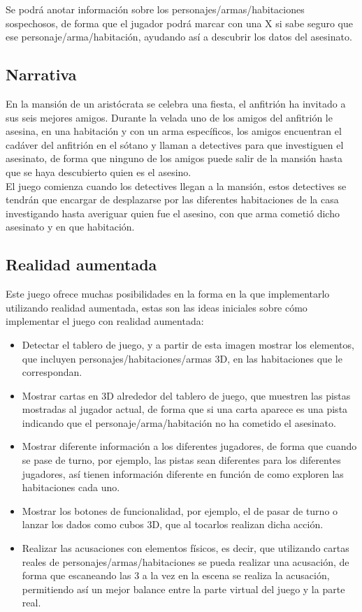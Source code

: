 Se podrá anotar información sobre los personajes/armas/habitaciones sospechosos, de forma que el jugador podrá marcar con una X si sabe seguro que ese personaje/arma/habitación, ayudando así a descubrir los datos del asesinato.

\subsection{Narrativa}
En la mansión de un aristócrata se celebra una fiesta, el anfitrión ha invitado a sus seis mejores amigos. Durante la velada uno de los amigos del anfitrión le asesina, en una habitación y con un arma específicos, los amigos encuentran el cadáver del anfitrión en el sótano y llaman a detectives para que investiguen el asesinato, de forma que ninguno de los amigos puede salir de la mansión hasta que se haya descubierto quien es el asesino.\\

El juego comienza cuando los detectives llegan a la mansión, estos detectives se tendrán que encargar de desplazarse por las diferentes habitaciones de la casa investigando hasta averiguar quien fue el asesino, con que arma cometió dicho asesinato y en que habitación.

\subsection{Realidad aumentada}
Este juego ofrece muchas posibilidades en la forma en la que implementarlo utilizando realidad aumentada, estas son las ideas iniciales sobre cómo implementar el juego con realidad aumentada:

\begin{itemize}
  \item Detectar el tablero de juego, y a partir de esta imagen mostrar los elementos, que incluyen personajes/habitaciones/armas 3D, en las habitaciones que le correspondan.
  \item Mostrar cartas en 3D alrededor del tablero de juego, que muestren las pistas mostradas al jugador actual, de forma que si una carta aparece es una pista indicando que el personaje/arma/habitación no ha cometido el asesinato.
  \item Mostrar diferente información a los diferentes jugadores, de forma que cuando se pase de turno, por ejemplo, las pistas sean diferentes para los diferentes jugadores, así tienen información diferente en función de como exploren las habitaciones cada uno.
  \item Mostrar los botones de funcionalidad, por ejemplo, el de pasar de turno o lanzar los dados como cubos 3D, que al tocarlos realizan dicha acción.
  \item Realizar las acusaciones con elementos físicos, es decir, que utilizando cartas reales de personajes/armas/habitaciones se pueda realizar una acusación, de forma que escaneando las 3 a la vez en la escena se realiza la acusación, permitiendo así un mejor balance entre la parte virtual del juego y la parte real.
\end{itemize}
